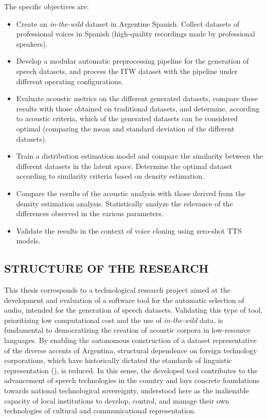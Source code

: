 The specific objectives are:

\begin{itemize}
    \item Create an \emph{in-the-wild} dataset in Argentine Spanish. Collect datasets of professional voices in Spanish (high-quality recordings made by professional speakers).
    \item Develop a modular automatic preprocessing pipeline for the generation of speech datasets, and process the ITW dataset with the pipeline under different operating configurations.
    \item Evaluate acoustic metrics on the different generated datasets, compare these results with those obtained on traditional datasets, and determine, according to acoustic criteria, which of the generated datasets can be considered optimal (comparing the mean and standard deviation of the different datasets).
    \item Train a distribution estimation model and compare the similarity between the different datasets in the latent space. Determine the optimal dataset according to similarity criteria based on density estimation.
    \item Compare the results of the acoustic analysis with those derived from the density estimation analysis. Statistically analyze the relevance of the differences observed in the various parameters.
    \item Validate the results in the context of voice cloning using zero-shot TTS models.
\end{itemize}

\subsection{STRUCTURE OF THE RESEARCH}

This thesis corresponds to a technological research project aimed at the development and evaluation of a software tool for the automatic selection of audio, intended for the generation of speech datasets. Validating this type of tool, prioritizing low computational cost and the use of \textit{in-the-wild} data, is fundamental to democratizing the creation of acoustic corpora in low-resource languages. By enabling the autonomous construction of a dataset representative of the diverse accents of Argentina, structural dependence on foreign technology corporations, which have historically dictated the standards of linguistic representation (\cite{ricaurte2019data}), is reduced. In this sense, the developed tool contributes to the advancement of speech technologies in the country and lays concrete foundations towards national technological sovereignty, understood here as the inalienable capacity of local institutions to develop, control, and manage their own technologies of cultural and communicational representation.

